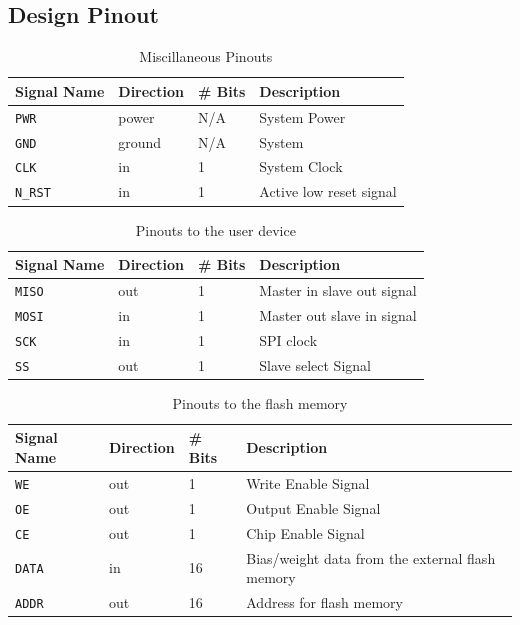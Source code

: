 \documentclass[12pt]{article}
\begin{document}
\subsection{Design Pinout}
\begin{table}[H]
    \centering
    \begin{tabular}[]{|l|l|l|p{250pt}|}
        \hline
        Signal Name & Direction & \# Bits & Description \\ \hline \hline
        \texttt{PWR} & power & N/A & System Power\\
        \texttt{GND} & ground & N/A & System \\
        \texttt{CLK} & in &1 & System Clock\\
        \texttt{N\_RST} & in & 1 & Active low reset signal\\\hline
    \end{tabular}
    \caption{Miscillaneous Pinouts}
    \label{tab:misc}
\end{table}

\begin{table}[H]
    \centering
    \begin{tabular}[]{|l|l|l|p{250pt}|}
        \hline
        Signal Name & Direction & \# Bits & Description \\ \hline \hline
        \texttt{MISO} & out & 1 & Master in slave out signal\\
        \texttt{MOSI} & in  & 1 & Master out slave in signal\\
        \texttt{SCK} & in & 1 & SPI clock\\
        \texttt{SS} & out& 1 & Slave select Signal\\\hline
    \end{tabular}
    \caption{Pinouts to the user device}
    \label{tab:user}
\end{table}

\begin{table}[H]
    \centering
    \begin{tabular}[]{|l|l|l|p{250pt}|}
        \hline
        Signal Name & Direction & \# Bits & Description \\ \hline \hline
        \texttt{WE} & out & 1 & Write Enable Signal\\
        \texttt{OE} & out & 1 & Output Enable Signal\\
        \texttt{CE} & out& 1 & Chip Enable Signal\\
        \texttt{DATA} & in & 16 & Bias/weight data from the external flash memory\\
        \texttt{ADDR} & out & 16 & Address for flash memory\\\hline
    \end{tabular}
    \caption{Pinouts to the flash memory}
    \label{tab:flash}
\end{table}
\end{document}

